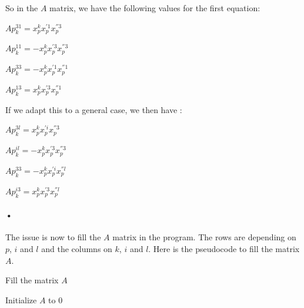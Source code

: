 \documentclass{report}
\begin{document}
So in the $A$ matrix, we have the following values for the first equation: 
\begin{center}
$Ap_{k}^{31} = x_{p}^{k}x_{p}^{'1}x_{p}^{''3}$
\end{center}
\begin{center}
$Ap_{k}^{11} = - x_{p}^{k}x_{p}^{'3}x_{p}^{''3}$
\end{center}
\begin{center}
$Ap_{k}^{33} = -x_{p}^{k} x_{p}^{'1}x_{p}^{''1}$
\end{center}
\begin{center}
$Ap_{k}^{13} = x_{p}^{k}x_{p}^{'3}x_{p}^{''1}$
\end{center}

If we adapt this to a general case, we then have  : 
\begin{center}
$Ap_{k}^{3l} = x_{p}^{k}x_{p}^{'i}x_{p}^{''3}$
\end{center}
\begin{center}
$Ap_{k}^{il} = - x_{p}^{k}x_{p}^{'3}x_{p}^{''3}$
\end{center}
\begin{center}
$Ap_{k}^{33} = -x_{p}^{k} x_{p}^{'i}x_{p}^{''l}$
\end{center}
\begin{center}
$Ap_{k}^{i3} = x_{p}^{k}x_{p}^{'3}x_{p}^{''l}$
\end{center}

\paragraph{•}
The issue is now to fill the $A$ matrix in the program. The rows are depending on $p$, $i$ and $l$ and the columns on $k$, $i$ and $l$. Here is the pseudocode to fill the matrix $A$. 

\begin{algorithm}
\SetLine
\caption{Fill the matrix $A$}
\SetLine
Initialize $A$ to 0

\end{algorithm}

\newpage
\end{document}
